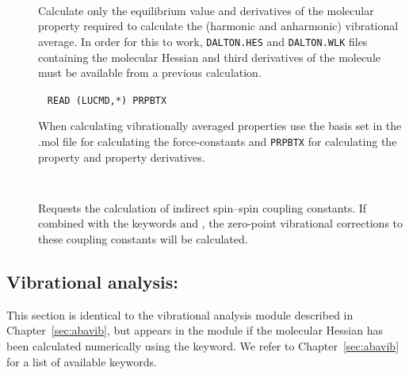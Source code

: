 \begin{description}
\item[]\verb| |\newline

Calculate only the equilibrium value and derivatives of the molecular property
required to calculate the (harmonic and anharmonic) vibrational average. 
In order for this to work, \verb|DALTON.HES| and \verb|DALTON.WLK| files containing the molecular Hessian 
and third derivatives of the molecule must be available from a previous calculation.

\item[]\verb| |\newline
\verb|READ (LUCMD,*) PRPBTX|

When calculating vibrationally averaged properties use the basis set in the 
.mol file for calculating the force-constants and \verb|PRPBTX| for 
calculating the property and property derivatives.

\item[]\verb| |\newline

Requests the calculation of indirect spin--spin coupling constants.
If combined with the keywords  and , the
zero-point vibrational corrections to these coupling constants will be
calculated.

\end{description}

\subsection{Vibrational analysis: }
\label{sec:nmddrv.vibana}

This section is identical to the vibrational analysis module described
in Chapter~\ref{sec:abavib}, but appears in the  module
if the molecular Hessian has been calculated numerically using the 
keyword. We refer to Chapter~\ref{sec:abavib} for a list of available
keywords.
